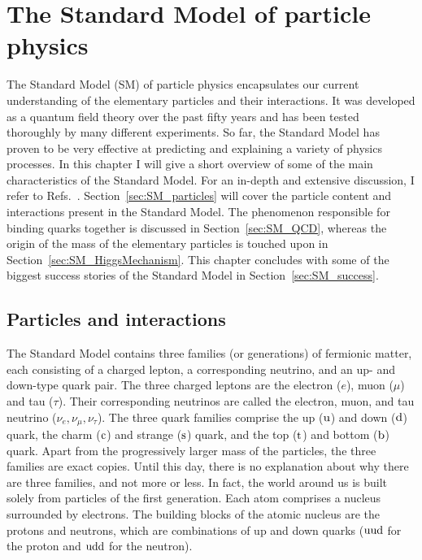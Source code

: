 \chapter{The Standard Model of particle physics \label{chap:standard_model}}

The Standard Model (SM) of particle physics encapsulates our current understanding of the elementary
particles and their interactions. 
It was developed as a quantum field theory over the past fifty years and has been tested thoroughly
by many different experiments. So far, the Standard Model has proven to be very effective at
predicting and explaining a variety of physics processes. 
In this chapter I will give a short overview of some of the main characteristics of the Standard
Model. For an in-depth and extensive discussion, I refer to
Refs.~\cite{Povh:1995mua,bettini2014introduction,Peskin:1995ev,Burgess:2007zi,Agashe:2014kda}.
Section~\ref{sec:SM_particles} will cover the particle content and interactions
present in the Standard Model. 
The phenomenon responsible for binding quarks together is discussed in Section~\ref{sec:SM_QCD},
whereas the origin of the mass of the elementary particles is touched upon in
Section~\ref{sec:SM_HiggsMechanism}. 
This chapter concludes with some of the biggest success stories of the Standard Model in
Section~\ref{sec:SM_success}.

\section{Particles and interactions \label{sec:SM_particles}}

The Standard Model contains three families (or generations) of fermionic matter, each consisting of
a charged lepton, a corresponding neutrino, and an up- and down-type quark pair.
The three charged leptons are the electron ($e$), muon ($\mu$) and tau ($\tau$). Their corresponding
neutrinos are called the electron, muon, and tau neutrino ($\nu_e, \nu_\mu, \nu_\tau$). 
The three quark families comprise the up ($\mathrm{u}$) and down ($\mathrm{d}$) quark, the charm
($\mathrm{c}$) and strange ($\mathrm{s}$) quark, and the top ($\mathrm{t}$) and bottom ($\mathrm{b}$) quark.
Apart from the progressively larger mass of the particles, the three families are exact copies.
Until this day, there is no explanation about why there are three families, and not more or less. 
In fact, the world around us is built solely from particles of the first generation. 
Each atom comprises a nucleus surrounded by electrons. 
The building blocks of the atomic nucleus are the protons and neutrons, which are combinations of up
and down quarks ($\mathrm{u}\mathrm{u}\mathrm{d}$ for the proton and $\mathrm{u}\mathrm{d}\mathrm{d}$ for the neutron).

